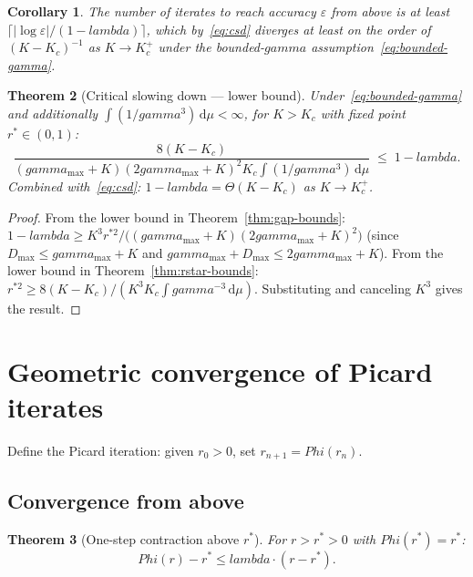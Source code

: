 \documentclass[11pt,a4paper]{article}
\let\Phi\relax\def\Phi{Phi}%
\let\lambda\relax\def\lambda{lambda}%
\let\gamma\relax\def\gamma{gamma}%
\newtheorem{theorem}{Theorem}[section]
\newtheorem{corollary}[theorem]{Corollary}
\theoremstyle{definition}
\begin{document}
\begin{corollary}\label{cor:csd-rate}
The number of iterates to reach accuracy $\varepsilon$ from above is at least $\lceil|\log\varepsilon|/(1-\lambda)\rceil$, which by~\eqref{eq:csd} diverges at least on the order of $(K-K_c)^{-1}$ as $K\to K_c^+$ under the bounded-$\gamma$ assumption~\eqref{eq:bounded-gamma}.
\end{corollary}

\begin{theorem}[Critical slowing down --- lower bound]\label{thm:csd-lower}
Under~\eqref{eq:bounded-gamma} and additionally $\int (1/\gamma^3)\,\mathrm{d}\mu < \infty$, for $K > K_c$ with fixed point $r^* \in (0,1)$:
\begin{equation}\label{eq:csd-lower}
\frac{8(K - K_c)}{(\gamma_{\max} + K)(2\gamma_{\max} + K)^2 K_c \int(1/\gamma^3)\,\mathrm{d}\mu} \;\leq\; 1 - \lambda.
\end{equation}
Combined with~\eqref{eq:csd}: $1 - \lambda = \Theta(K - K_c)$ as $K \to K_c^+$.
\end{theorem}

\begin{proof}
From the lower bound in Theorem~\ref{thm:gap-bounds}: $1 - \lambda \geq K^3 r^{*2}/\bigl((\gamma_{\max}+K)(2\gamma_{\max}+K)^2\bigr)$ (since $D_{\max} \leq \gamma_{\max} + K$ and $\gamma_{\max} + D_{\max} \leq 2\gamma_{\max} + K$). From the lower bound in Theorem~\ref{thm:rstar-bounds}: $r^{*2} \geq 8(K-K_c)/(K^3 K_c \int\gamma^{-3}\,\mathrm{d}\mu)$. Substituting and canceling $K^3$ gives the result.
\end{proof}

\section{Geometric convergence of Picard iterates}\label{sec:convergence}

Define the Picard iteration: given $r_0 > 0$, set $r_{n+1} = \Phi(r_n)$.

\subsection{Convergence from above}

\begin{theorem}[One-step contraction above $r^*$]\label{thm:one-step}
For $r > r^* > 0$ with $\Phi(r^*) = r^*$:
\[
\Phi(r) - r^* \leq \lambda \cdot (r - r^*).
\]
\end{theorem}
\end{document}
